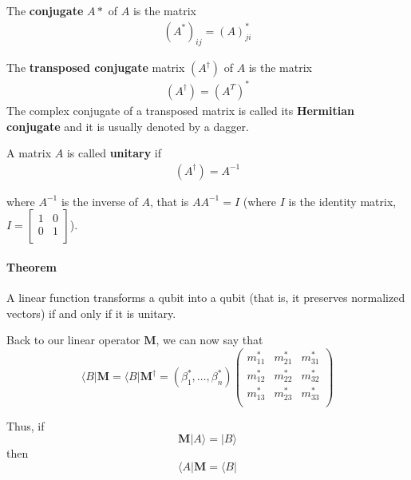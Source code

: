 \documentclass[a4paper,10pt]{article}
\begin{document}
The \textbf{conjugate} $A*$ of $A$ is the matrix
\begin{equation}
\begin{aligned}
(A^*)_{ij} = (A)_{ji}^*
\end{aligned}
\label{eq:conjugateMatrix}
\end{equation}

The \textbf{transposed conjugate} matrix $(A^\dagger)$ of $A$ is the matrix
\begin{equation}
\begin{aligned}
(A^\dagger) = (A^T)^*
\end{aligned}
\label{eq:transpodedConjugateMatrix}
\end{equation}
The complex conjugate of a transposed matrix is called its \textbf{Hermitian conjugate} and it is usually denoted by a dagger.

A matrix $A$ is called \textbf{unitary} if
\begin{equation}
\begin{aligned}
(A^\dagger) = A^{-1}
\end{aligned}
\label{eq:unitaryMatrix}
\end{equation}

where $A^{-1}$ is the inverse of $A$, that is $AA^{-1} = I$ (where $I$ is the identity matrix, $I = \begin{bmatrix}
1 & 0 \\
0 & 1 \\
\end{bmatrix}$).

\paragraph{Theorem} A linear function transforms a qubit into a qubit (that is, it preserves normalized vectors) if and only if it is unitary.

Back to our linear operator $\mathbf{M}$, we can now say that
\begin{equation*}
\langle B|\mathbf{M} = \langle B|\mathbf{M}^\dagger = (\beta_1^*, \ldots, \beta_n^*) \left(\begin{matrix}
    m_{11}^* & m_{21}^* & m_{31}^* \\
    m_{12}^* & m_{22}^* & m_{32}^* \\
    m_{13}^* & m_{23}^* & m_{33}^* \\
\end{matrix}\right)
\end{equation*}

Thus, if 
$$\mathbf{M}|A\rangle  = |B\rangle$$
then
$$\langle A|\mathbf{M} = \langle B|$$
\end{document}

